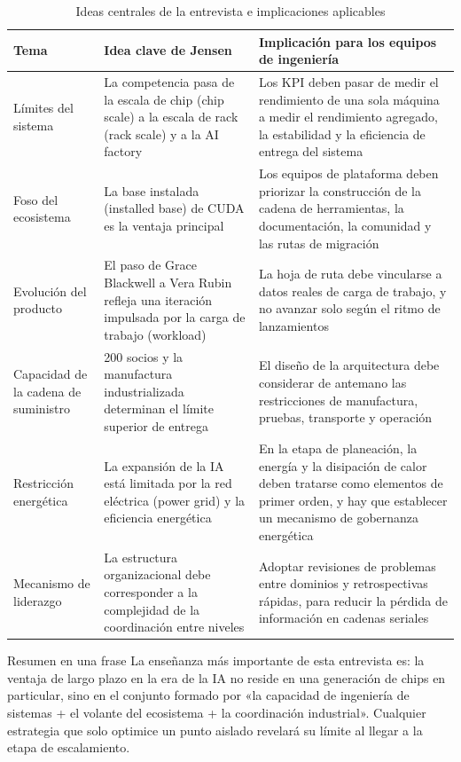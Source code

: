 \documentclass[a4paper]{article}
\begin{document}
\begin{table}[H]
\centering
\caption{Ideas centrales de la entrevista e implicaciones aplicables}
\begin{tabular}{p{} p{} p{}}
\toprule
Tema & Idea clave de Jensen & Implicación para los equipos de ingeniería \\
\midrule
Límites del sistema & La competencia pasa de la escala de chip (chip scale) a la escala de rack (rack scale) y a la AI factory & Los KPI deben pasar de medir el rendimiento de una sola máquina a medir el rendimiento agregado, la estabilidad y la eficiencia de entrega del sistema \\
\addlinespace
Foso del ecosistema & La base instalada (installed base) de CUDA es la ventaja principal & Los equipos de plataforma deben priorizar la construcción de la cadena de herramientas, la documentación, la comunidad y las rutas de migración \\
\addlinespace
Evolución del producto & El paso de Grace Blackwell a Vera Rubin refleja una iteración impulsada por la carga de trabajo (workload) & La hoja de ruta debe vincularse a datos reales de carga de trabajo, y no avanzar solo según el ritmo de lanzamientos \\
\addlinespace
Capacidad de la cadena de suministro & 200 socios y la manufactura industrializada determinan el límite superior de entrega & El diseño de la arquitectura debe considerar de antemano las restricciones de manufactura, pruebas, transporte y operación \\
\addlinespace
Restricción energética & La expansión de la IA está limitada por la red eléctrica (power grid) y la eficiencia energética & En la etapa de planeación, la energía y la disipación de calor deben tratarse como elementos de primer orden, y hay que establecer un mecanismo de gobernanza energética \\
\addlinespace
Mecanismo de liderazgo & La estructura organizacional debe corresponder a la complejidad de la coordinación entre niveles & Adoptar revisiones de problemas entre dominios y retrospectivas rápidas, para reducir la pérdida de información en cadenas seriales \\
\bottomrule
\end{tabular}
\end{table}

\begin{importantbox}{Resumen en una frase}
La enseñanza más importante de esta entrevista es: la ventaja de largo plazo en la era de la IA no reside en una generación de chips en particular, sino en el conjunto formado por «la capacidad de ingeniería de sistemas + el volante del ecosistema + la coordinación industrial». Cualquier estrategia que solo optimice un punto aislado revelará su límite al llegar a la etapa de escalamiento.
\end{importantbox}
\end{document}
